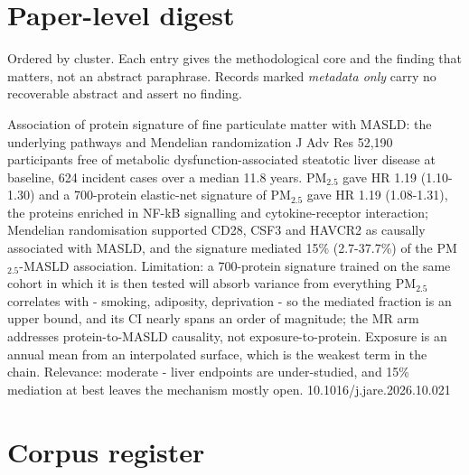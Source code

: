 \documentclass[10pt]{article}
\begin{document}
\vspace{4mm}

\par{}\baselineskip{}\baselineskip
\section*{\sffamily\bfseries\color{Deep}Paper-level digest}
\vspace{-1.5mm}{\color{Amber}\rule{\linewidth}{1.1pt}}\vspace{2.5mm}

{\fontsize{7.4}{9}\selectfont\color{Slate}Ordered by cluster. Each entry gives the
methodological core and the finding that matters, not an abstract paraphrase. Records
marked \textit{metadata only} carry no recoverable abstract and assert no finding.\par}


{Association of protein signature of fine particulate matter with MASLD: the underlying pathways and Mendelian randomization}
{J Adv Res}
{52,190 participants free of metabolic dysfunction-associated steatotic liver disease at baseline, 624 incident cases over a median 11.8 years. PM$_{2.5}$ gave HR 1.19 (1.10-1.30) and a 700-protein elastic-net signature of PM$_{2.5}$ gave HR 1.19 (1.08-1.31), the proteins enriched in NF-kB signalling and cytokine-receptor interaction; Mendelian randomisation supported CD28, CSF3 and HAVCR2 as causally associated with MASLD, and the signature mediated 15\% (2.7-37.7\%) of the PM$_{2.5}$-MASLD association. Limitation: a 700-protein signature trained on the same cohort in which it is then tested will absorb variance from everything PM$_{2.5}$ correlates with - smoking, adiposity, deprivation - so the mediated fraction is an upper bound, and its CI nearly spans an order of magnitude; the MR arm addresses protein-to-MASLD causality, not exposure-to-protein. Exposure is an annual mean from an interpolated surface, which is the weakest term in the chain. Relevance: moderate - liver endpoints are under-studied, and 15\% mediation at best leaves the mechanism mostly open.}
{10.1016/j.jare.2026.10.021}

\clearpage
\section*{\sffamily\bfseries\color{Deep}Corpus register}
\vspace{-1.5mm}{\color{Amber}\rule{\linewidth}{1.1pt}}\vspace{2.5mm}
\end{document}
